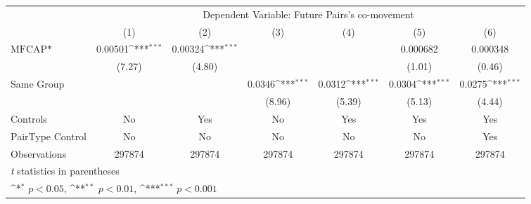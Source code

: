 {
\def\sym#1{\ifmmode^{#1}\else\(^{#1}\)\fi}
\begin{tabular}{l*{6}{c}}
\hline\hline
                &\multicolumn{6}{c}{Dependent Variable:  Future Pairs's co-movement}                                              \\\cmidrule(lr){2-7}
                &\multicolumn{1}{c}{(1)}         &\multicolumn{1}{c}{(2)}         &\multicolumn{1}{c}{(3)}         &\multicolumn{1}{c}{(4)}         &\multicolumn{1}{c}{(5)}         &\multicolumn{1}{c}{(6)}         \\
\hline
$ \text{MFCAP*} $&  0.00501\sym{***}&  0.00324\sym{***}&                  &                  & 0.000682         & 0.000348         \\
                &   (7.27)         &   (4.80)         &                  &                  &   (1.01)         &   (0.46)         \\
[1em]
Same Group      &                  &                  &   0.0346\sym{***}&   0.0312\sym{***}&   0.0304\sym{***}&   0.0275\sym{***}\\
                &                  &                  &   (8.96)         &   (5.39)         &   (5.13)         &   (4.44)         \\
\hline
Controls        &       No         &      Yes         &       No         &      Yes         &      Yes         &      Yes         \\
PairType Control&       No         &       No         &       No         &       No         &       No         &      Yes         \\
Observations    &   297874         &   297874         &   297874         &   297874         &   297874         &   297874         \\
\hline\hline
\multicolumn{7}{l}{\footnotesize \textit{t} statistics in parentheses}\\
\multicolumn{7}{l}{\footnotesize \sym{*} \(p<0.05\), \sym{**} \(p<0.01\), \sym{***} \(p<0.001\)}\\
\end{tabular}
}
